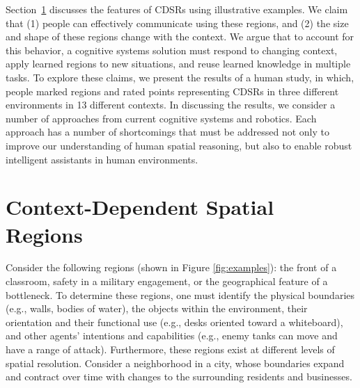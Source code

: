 \documentclass[11pt,letterpaper]{article}
\begin{document}
Section~\ref{sec:cdsrs} discusses the features of CDSRs using illustrative examples.  We claim that (1) people can effectively communicate using these regions, and (2) the size and shape of these regions change with the context.  We argue that to account for this behavior, a cognitive systems solution must respond to changing context, apply learned regions to new situations, and reuse learned knowledge in multiple tasks.  To explore these claims, we present the results of a human study, in which, people marked regions and rated points representing CDSRs in three different environments in 13 different contexts.  In discussing the results, we consider a number of approaches from current cognitive systems and robotics.  Each approach has a number of shortcomings that must be addressed not only to improve our understanding of human spatial reasoning, but also to enable robust intelligent assistants in human environments.

\section{Context-Dependent Spatial Regions}\label{sec:cdsrs}

Consider the following regions (shown in Figure \ref{fig:examples}): the front of a classroom, safety in a military engagement, or the geographical feature of a bottleneck.  To determine these regions, one must identify the physical boundaries (e.g., walls, bodies of water), the objects within the environment, their orientation and their functional use (e.g., desks oriented toward a whiteboard), and other agents' intentions and capabilities (e.g., enemy tanks can move and have a range of attack).  Furthermore, these regions exist at different levels of spatial resolution.  Consider a neighborhood in a city, whose boundaries expand and contract over time with changes to the surrounding residents and businesses.
\end{document}
